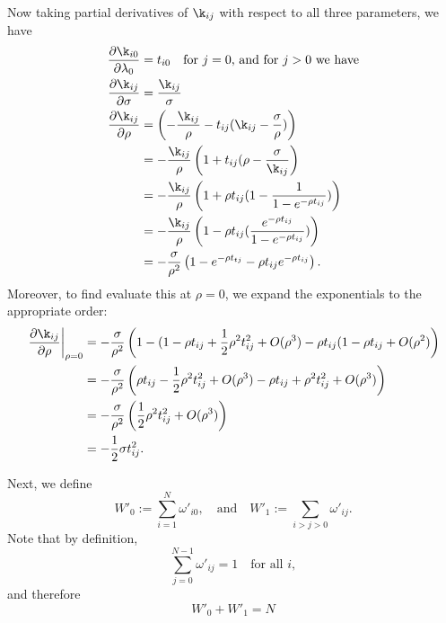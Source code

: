 \documentclass[12pt,leqno]{article}
\begin{document}
Now taking partial derivatives of $\k_{ij}$ with respect to all three parameters, we have
\begin{equation}\label{dk_dparams}
  \begin{split}
    \frac{\partial\k_{i0}}{\partial\lambda_0} &= 
        t_{i0} \quad\text{for $j = 0$, and for $j > 0$ we have}\\
    \frac{\partial\k_{ij}}{\partial\sigma} &= 
      \frac{\k_{ij}}{\sigma}\\
    \frac{\partial\k_{ij}}{\partial\rho} &=
    \left(-\frac{\k_{ij}}{\rho} -t_{ij}(\k_{ij} - \frac{\sigma}{\rho})\right)\\
    &= -\frac{\k_{ij}}{\rho}\left(1 + t_{ij}(\rho-\frac{\sigma}{\k_{ij}}\right) \\
    &= -\frac{\k_{ij}}{\rho}\left(1 + \rho{t_{ij}}(1-\frac{1}{1-e^{-\rho{t_{ij}}}})\right)\\
    &= -\frac{\k_{ij}}{\rho}\left(1 - \rho{t_{ij}}(\frac{e^{-\rho{t_{ij}}}}{1-e^{-\rho{t_{ij}}}})\right)\\
    &= -\frac{\sigma}{\rho^2}\left(1-e^{-\rho{t_{tj}}} - \rho{t_{ij}}e^{-\rho{t_{ij}}}\right).\\
  \end{split}
\end{equation}
Moreover, to find evaluate this at $\rho = 0$, we expand the exponentials to the appropriate order:
\begin{equation}\label{dk_drho(0)}
  \begin{split}
    \left.\frac{\partial\k_{ij}}{\partial\rho}\right|_{\rho=0} &=
    -\frac{\sigma}{\rho^2}\left(1-(1-\rho t_{ij} + \frac{1}{2}\rho^2t_{ij}^2 + O(\rho^3) - \rho t_{ij}(1 - \rho t_{ij} + O(\rho^2)\right)\\
      &= -\frac{\sigma}{\rho^2}\left(\rho t_{ij} - \frac{1}{2}\rho^2t_{ij}^2 + O(\rho^3) - \rho t_{ij} + \rho^2 t_{ij}^2 + O(\rho^3)\right)\\
        &= -\frac{\sigma}{\rho^2}\left(\frac{1}{2}\rho^2t_{ij}^2 + O(\rho^3)\right)\\
          &= -\frac{1}{2}\sigma t_{ij}^2.
\end{split}
\end{equation}

Next, we define
$$
W'_0 := \sum_{i=1}^N\omega'_{i0},\quad\text{and}\quad   W'_1 := \sum_{i>j>0}\omega'_{ij}.
$$
Note that by definition,
$$
\sum_{j=0}^{N-1}\omega'_{ij} = 1\quad\text{for all } i,
$$
and therefore
\begin{equation}\label{W0+W1}
  W'_0 + W'_1 = N
\end{equation}
\end{document}
